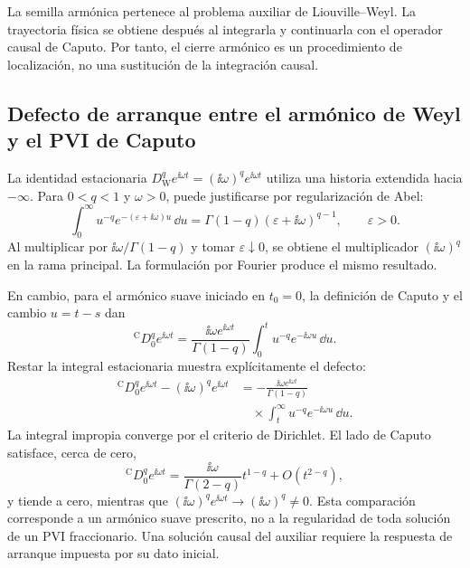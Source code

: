La semilla armónica pertenece al problema auxiliar de Liouville--Weyl. La
trayectoria física se obtiene después al integrarla y continuarla con el
operador causal de Caputo. Por tanto, el cierre armónico es un procedimiento
de localización, no una sustitución de la integración causal.

\subsection{Defecto de arranque entre el armónico de Weyl y el PVI de Caputo}
\label{subsec:armonic-weyl-caputo-defect}

La identidad estacionaria
\(D_{\mathrm W}^{q}e^{\ii\omega t}=(\ii\omega)^qe^{\ii\omega t}\)
utiliza una historia extendida hacia \(-\infty\). Para \(0<q<1\) y
\(\omega>0\), puede justificarse por regularización de Abel:
\begin{equation}
 \int_0^\infty u^{-q}e^{-(\varepsilon+\ii\omega)u}\,\dd u
 =\Gamma(1-q)(\varepsilon+\ii\omega)^{q-1},
 \qquad\varepsilon>0.
 \label{eq:weyl-abel-harmonic}
\end{equation}
Al multiplicar por \(\ii\omega/\Gamma(1-q)\) y tomar
\(\varepsilon\downarrow0\), se obtiene el multiplicador
\((\ii\omega)^q\) en la rama principal. La formulación por Fourier
produce el mismo resultado.

En cambio, para el armónico suave iniciado en \(t_0=0\), la definición
de Caputo y el cambio \(u=t-s\) dan
\begin{equation}
 {}^{\mathrm C}D_0^q e^{\ii\omega t}
 =\frac{\ii\omega e^{\ii\omega t}}{\Gamma(1-q)}
    \int_0^t u^{-q}e^{-\ii\omega u}\,\dd u.
 \label{eq:caputo-harmonic-finite-history}
\end{equation}
Restar la integral estacionaria muestra explícitamente el defecto:
\begin{equation}
 \begin{aligned}
 {}^{\mathrm C}D_0^q e^{\ii\omega t}
       -(\ii\omega)^qe^{\ii\omega t}
 &=-\frac{\ii\omega e^{\ii\omega t}}{\Gamma(1-q)}\\
 &\quad\times\int_t^\infty u^{-q}e^{-\ii\omega u}\,\dd u.
 \end{aligned}
 \label{eq:caputo-weyl-startup-defect}
\end{equation}
La integral impropia converge por el criterio de Dirichlet. El lado de
Caputo satisface, cerca de cero,
\[
 {}^{\mathrm C}D_0^q e^{\ii\omega t}
 =\frac{\ii\omega}{\Gamma(2-q)}t^{1-q}
      +O(t^{2-q}),
\]
y tiende a cero, mientras que
\((\ii\omega)^qe^{\ii\omega t}\to(\ii\omega)^q\ne0\).
Esta comparación corresponde a un armónico suave prescrito, no a la
regularidad de toda solución de un PVI fraccionario. Una solución causal
del auxiliar requiere la respuesta de arranque impuesta por su dato inicial.

